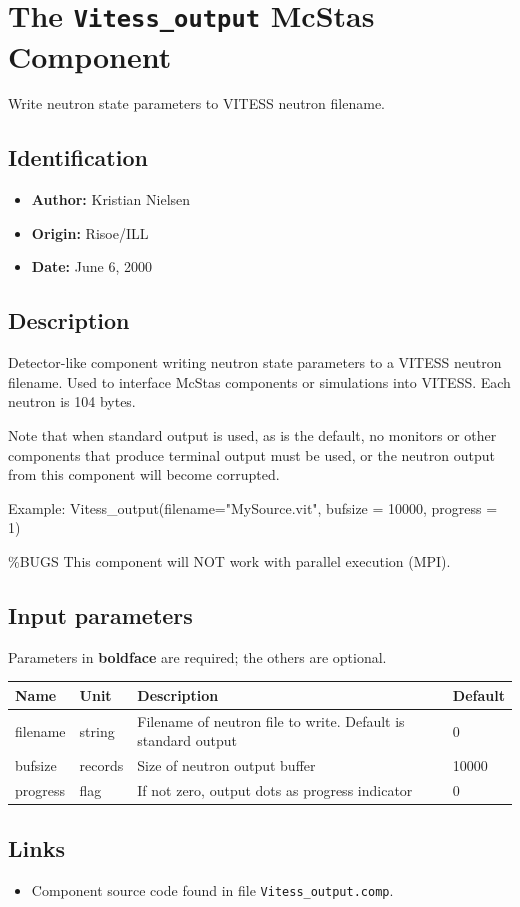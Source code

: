 \section{The \texttt{Vitess\_output} McStas Component}
Write neutron state parameters to VITESS neutron filename.

\subsection*{Identification}
\begin{itemize}
  \item \textbf{Author:} Kristian Nielsen
  \item \textbf{Origin:} Risoe/ILL
  \item \textbf{Date:} June 6, 2000
\end{itemize}

\subsection*{Description}
Detector-like component writing neutron state parameters to a VITESS neutron filename. Used to interface McStas components or simulations into VITESS. Each neutron is 104 bytes.

Note that when standard output is used, as is the default, no monitors or other components that produce terminal output must be used, or the neutron output from this component will become corrupted.

Example: Vitess\_output(filename="MySource.vit", bufsize = 10000, progress = 1)

\%BUGS This component will NOT work with parallel execution (MPI).

\subsection*{Input parameters}
Parameters in \textbf{boldface} are required; the others are optional.

\begin{longtable}{p{}p{}p{}p{}}
\toprule
\textbf{Name} & \textbf{Unit} & \textbf{Description} & \textbf{Default} \\
\midrule
\endhead
filename & string & Filename of neutron file to write. Default is standard output & 0 \\
bufsize & records & Size of neutron output buffer & 10000 \\
progress & flag & If not zero, output dots as progress indicator & 0 \\
\bottomrule
\end{longtable}

\subsection*{Links}
\begin{itemize}
  \item Component source code found in file \texttt{Vitess\_output.comp}.
\end{itemize}
